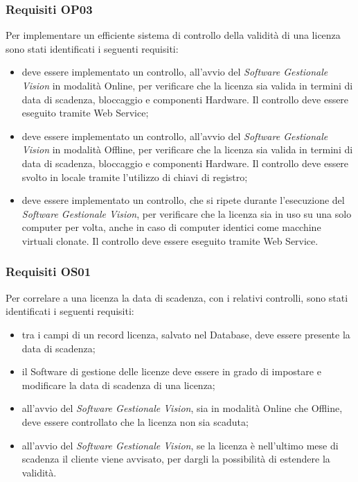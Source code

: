 \subsubsection{Requisiti OP03}

Per implementare un efficiente sistema di controllo della validità di una licenza sono stati identificati i seguenti requisiti:

\begin{itemize}
\item deve essere implementato un controllo, all'avvio del \textit{Software Gestionale Vision} in modalità Online, per verificare che la licenza sia valida in termini di data di scadenza, bloccaggio e componenti Hardware. Il controllo deve essere eseguito tramite Web Service; 
\item deve essere implementato un controllo, all'avvio del \textit{Software Gestionale Vision} in modalità Offline, per verificare che la licenza sia valida in termini di data di scadenza, bloccaggio e componenti Hardware. Il controllo deve essere svolto in locale tramite l'utilizzo di chiavi di registro;
\item deve essere implementato un controllo, che si ripete durante l'esecuzione del \textit{Software Gestionale Vision}, per verificare che la licenza sia in uso su una solo computer per volta, anche in caso di computer identici come macchine virtuali clonate. Il controllo deve essere eseguito tramite Web Service.
\end{itemize}

\subsubsection{Requisiti OS01}

Per correlare a una licenza la data di scadenza, con i relativi controlli, sono stati identificati i seguenti requisiti:

\begin{itemize}
\item tra i campi di un record licenza, salvato nel Database, deve essere presente la data di scadenza;
\item il Software di gestione delle licenze deve essere in grado di impostare e modificare la data di scadenza di una licenza;
\item all'avvio del \textit{Software Gestionale Vision}, sia in modalità Online che Offline, deve essere controllato che la licenza non sia scaduta;
\item all'avvio del \textit{Software Gestionale Vision}, se la licenza è nell'ultimo mese di scadenza il cliente viene avvisato, per dargli la possibilità di estendere la validità.
\end{itemize}

